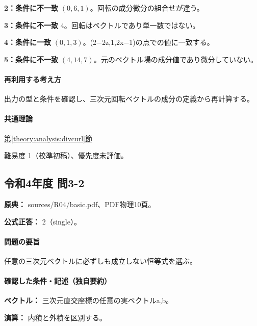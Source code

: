 \noindent\textbf{2：条件に不一致} \((0,6,1)\)。回転の成分微分の組合せが違う。\par

\noindent\textbf{3：条件に不一致} \(4\)。回転はベクトルであり単一数ではない。\par

\noindent\textbf{4：条件に一致} \((0,1,3)\)。(2−2z,1,2x−1)の点での値に一致する。\par

\noindent\textbf{5：条件に不一致} \((4,14,7)\)。元のベクトル場の成分値であり微分していない。\par

\paragraph{再利用する考え方} 出力の型と条件を確認し、三次元回転ベクトルの成分の定義から再計算する。

\paragraph{共通理論} \hyperref[theory:analysis:divcurl]{第\ref*{theory:analysis:divcurl}節}

\par 難易度 1（校準初稿）、優先度未評価。

\subsection{令和4年度 問3-2}
\label{q:r04-reg-basic-3-2}

\noindent\textbf{原典：} sources/R04/basic.pdf、PDF物理10頁。

\textbf{公式正答：} 2（single）。

\paragraph{問題の要旨} 任意の三次元ベクトルに必ずしも成立しない恒等式を選ぶ。

\paragraph{確認した条件・記述（独自要約）}\mbox{}\par

\noindent\textbf{ベクトル：} 三次元直交座標の任意の実ベクトルa,b。\par

\noindent\textbf{演算：} 内積と外積を区別する。\par

